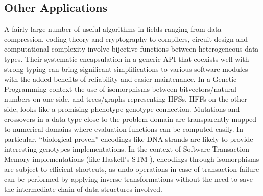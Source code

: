 \documentclass[]{INCLUDES/llncs}
\begin{document}
\subsection{Other Applications}
A fairly large number of useful algorithms in fields 
ranging from data compression, coding theory and cryptography 
to compilers, circuit design and computational complexity
involve bijective functions between heterogeneous data
types. Their systematic encapsulation in a generic API
that coexists well with strong typing can bring 
significant simplifications to various software modules
with the added benefits of reliability and easier 
maintenance.
In a Genetic Programming context \cite{koza92} the use 
of isomorphisms between bitvectors/natural numbers 
on one side, and trees/graphs representing HFSs, HFFs on the other side, 
looks like a promising phenotype-genotype connection.
Mutations and crossovers in a data type close to the problem
domain are transparently mapped to numerical domains
where evaluation functions can be computed easily.
In particular, ``biological proven'' encodings like 
DNA strands are likely to provide interesting 
genotypes implementations. 
In the context of Software Transaction Memory implementations
(like Haskell's STM \cite{DBLP:journals/cacm/HarrisMJH08}),
encodings through isomorphisms are subject to efficient
shortcuts, as undo operations in case of transaction failure
can be performed by applying inverse transformations without
the need to save the intermediate chain of
data structures involved.
\end{document}
